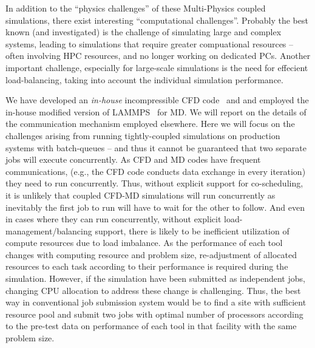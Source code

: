 \documentclass[a4paper]{article}
\begin{document}
In addition to the ``physics challenges'' of these Multi-Physics coupled simulations, there exist interesting ``computational challenges''. Probably the best known (and investigated) is the challenge of simulating large and complex systems, leading to simulations that require greater compuational resources -- often involving HPC resources, and no longer working on dedicated PCs. Another important challenge, especially for large-scale simulations is the need for effecient load-balancing, taking into account the individual simulation performance.

We have developed an {\it in-house} incompressible CFD code~\cite{Lee:2006} and and employed the in-house modified version of LAMMPS~\cite{LAMMPS} for MD. We will report on the details of the communication mechanism employed elsewhere. Here we will focus on the challenges arising from running tightly-coupled simulations on production systems with batch-queues -- and thus it cannot be guaranteed that two separate jobs will execute concurrently.  As CFD and MD codes have frequent communications, (e.g., the CFD code conducts data exchange in every iteration) they need to run concurrently.  Thus, without explicit support for co-scheduling, it is unlikely that coupled CFD-MD simulations will run concurrently as inevitably the first job to run will have to wait for the other to follow.
And even in cases where they can run concurrently, without explicit load-management/balancing support, there is likely to be inefficient utilization of compute resources due to load imbalance.  As the performance of each tool changes with computing resource and problem size, re-adjustment of allocated resources to each task according to their performance is required during the simulation. However, if the simulation have been submitted as independent jobs, changing CPU allocation to address these change is challenging. Thus, the best way in conventional job submission system would be to find a site with sufficient resource pool and submit two jobs with optimal number of processors according to the pre-test data on performance of each tool in that facility with the same problem size.
\end{document}
